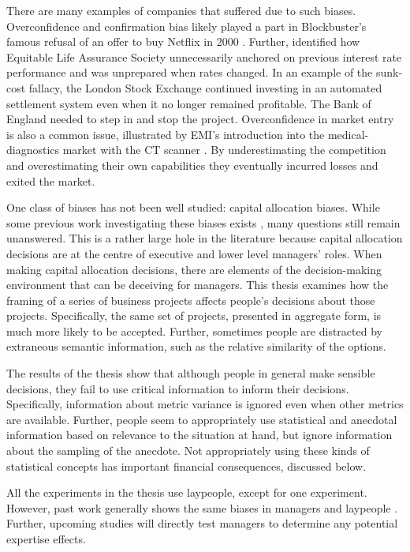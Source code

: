\documentclass[a4paper, nobind]{templates/ociamthesis}
\theoremstyle{definition}
\theoremstyle{definition}
\theoremstyle{definition}
\theoremstyle{definition}
\theoremstyle{remark}
\begin{document}
There are many examples of companies that suffered due to such biases.
Overconfidence and confirmation bias likely played a part in Blockbuster's
famous refusal of an offer to buy Netflix in 2000 \autocite{meissner2015}. Further,
\textcite{roxburgh2003} identified how Equitable Life Assurance Society unnecessarily
anchored on previous interest rate performance and was unprepared when rates
changed. In an example of the sunk-cost fallacy, the London Stock Exchange
continued investing in an automated settlement system even when it no longer
remained profitable. The Bank of England needed to step in and stop the project.
Overconfidence in market entry is also a common issue, illustrated by EMI's
introduction into the medical-diagnostics market with the CT scanner \autocite{horn2005,camerer1999}. By underestimating the competition and overestimating their own
capabilities they eventually incurred losses and exited the market.

One class of biases has not been well studied: capital allocation biases. While
some previous work investigating these biases exists \autocite[e.g.,][]{bardolet2011}, many
questions still remain unanswered. This is a rather large hole in the literature
because capital allocation decisions are at the centre of executive and lower
level managers' roles. When making capital allocation decisions, there are
elements of the decision-making environment that can be deceiving for managers.
This thesis examines how the framing of a series of business projects affects
people's decisions about those projects. Specifically, the same set of projects,
presented in aggregate form, is much more likely to be accepted. Further,
sometimes people are distracted by extraneous semantic information, such as the
relative similarity of the options.

The results of the thesis show that although people in general make sensible
decisions, they fail to use critical information to inform their decisions.
Specifically, information about metric variance is ignored even when other
metrics are available. Further, people seem to appropriately use statistical and
anecdotal information based on relevance to the situation at hand, but ignore
information about the sampling of the anecdote. Not appropriately using these
kinds of statistical concepts has important financial consequences, discussed
below.

All the experiments in the thesis use laypeople, except for one experiment.
However, past work generally shows the same biases in managers and laypeople
\autocite[with some showing more bias in managers, e.g.,][]{haigh2005}. Further, upcoming
studies will directly test managers to determine any potential expertise
effects.
\end{document}
